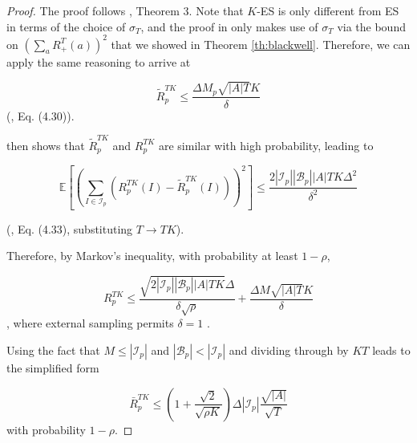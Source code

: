 \documentclass{article}
\begin{document}
\begin{proof}
The proof follows \citealt{lanctot2013monte}, Theorem 3. Note that $K$-ES is only different from ES in terms of the choice of $\sigma_T$, and the proof in \citealt{lanctot2013monte} only makes use of $\sigma_T$ via the bound on $(\sum_a R_+^T(a) )^2$ that we showed in Theorem \ref{th:blackwell}. Therefore, we can apply the same reasoning to arrive at

\begin{equation}
\tilde{R}_p^{TK} \leq
\frac{\Delta M_p \sqrt{|A|T} K}{\delta}
\end{equation}
(\citealt{lanctot2013monte}, Eq. (4.30)).

\citealt{Lanctot09:Monte} then shows that $\tilde{R}_p^{TK}$ and $R_p^{TK}$ are similar with high probability, leading to

\begin{equation}
    \mathbb{E}\left[\left(\sum_{I\in \mathcal{I}_p}(R_p^{TK}(I) - \tilde{R}_p^{TK}(I))\right)^2\right] \leq
    \frac{2|\mathcal{I}_p||\mathcal{B}_p||A| T K \Delta^2}{\delta^2} 
\end{equation}

(\citealt{lanctot2013monte}, Eq. (4.33), substituting $T \to TK$).

Therefore, by Markov's inequality, with probability at least $1-\rho$,

\begin{equation}
    R_p^{TK} \leq
    \frac{\sqrt{2|\mathcal{I}_p||\mathcal{B}_p||A|TK}\Delta}{\delta\sqrt{\rho}} +
    \frac{\Delta M\sqrt{|A|T}K}{\delta}
\end{equation}
, where external sampling permits $\delta=1$ \cite{lanctot2013monte}.

Using the fact that $M \leq |\mathcal{I}_p|$ and $|\mathcal{B}_p|<|\mathcal{I}_p|$ and dividing through by $KT$ leads to the simplified form

\begin{equation}
    \bar{R}_p^{TK} \leq \left(1 + \frac{\sqrt{2}}{\sqrt{\rho K}}\right)\Delta |\mathcal{I}_p| \frac{\sqrt{|A|}}{\sqrt{T}}
\end{equation}
with probability $1-\rho$.



\end{proof}
\end{document}
